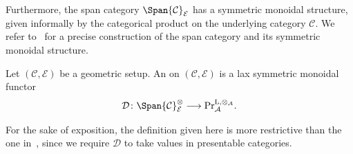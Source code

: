 Furthermore, the span category $\Span{\mathcal C}_{\mathcal E}$ has a symmetric monoidal structure, given informally by the categorical product on the underlying category $\mathcal C$. We refer to~\cites[][Definition 6.1.1]{Liu_Zheng2012}[][Definition~A.5.2 and Remark A.5.5]{Mann2022} for a precise construction of the span category and its symmetric monoidal structure.
\begin{defn}\label{defn:six-func}
  Let $(\mathcal C, \mathcal E)$ be a geometric setup. An  on $(\mathcal C,\mathcal E)$ is a lax symmetric monoidal functor
  \[
    \mathcal D\colon\Span{\mathcal C}_{\mathcal E}^{\otimes}\longrightarrow
    \mathrm{Pr}^{\mathrm{L},\otimes_{\mathcal A}}_{\mathcal A}.
  \]
\end{defn}
For the sake of exposition, the definition given here is more restrictive than the one in~\cite{Mann2022}, since we require $\mathcal D$ to take values in presentable categories.

\medskip

